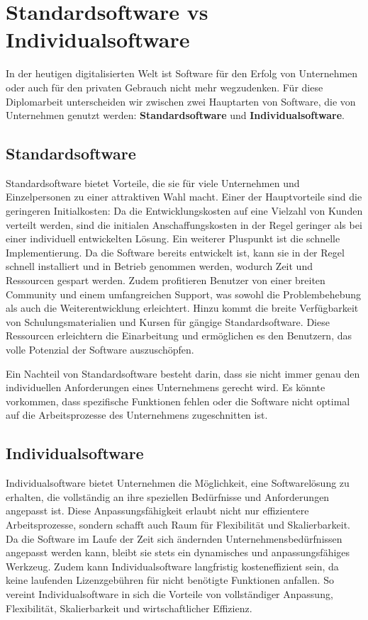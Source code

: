 \section {Standardsoftware vs Individualsoftware}

In der heutigen digitalisierten Welt ist Software 
für den Erfolg von Unternehmen oder auch für den privaten Gebrauch nicht mehr wegzudenken.
Für diese Diplomarbeit unterscheiden wir zwischen zwei Hauptarten von Software, 
die von Unternehmen genutzt werden: 
\textbf{Standardsoftware} und 
\textbf{Individualsoftware}.

\subsection*{Standardsoftware}

Standardsoftware bietet Vorteile, die sie für viele Unternehmen und Einzelpersonen 
zu einer attraktiven Wahl macht. Einer der Hauptvorteile sind die geringeren Initialkosten: 
Da die Entwicklungskosten auf eine Vielzahl von Kunden verteilt werden, sind die initialen 
Anschaffungskosten in der Regel geringer als bei einer individuell entwickelten Lösung. 
Ein weiterer Pluspunkt ist die schnelle Implementierung. Da die Software bereits entwickelt ist, 
kann sie in der Regel schnell installiert und in Betrieb genommen werden, 
wodurch Zeit und Ressourcen gespart werden. Zudem profitieren Benutzer von einer 
breiten Community und einem umfangreichen Support, was sowohl die Problembehebung 
als auch die Weiterentwicklung erleichtert. Hinzu kommt die breite Verfügbarkeit von 
Schulungsmaterialien und Kursen für gängige Standardsoftware. 
Diese Ressourcen erleichtern die Einarbeitung und ermöglichen es den Benutzern, 
das volle Potenzial der Software auszuschöpfen.

Ein Nachteil von Standardsoftware besteht darin, dass sie nicht immer genau 
den individuellen Anforderungen eines Unternehmens gerecht wird. 
Es könnte vorkommen, dass spezifische Funktionen fehlen oder die Software 
nicht optimal auf die Arbeitsprozesse des Unternehmens zugeschnitten ist.

\newpage
\subsection*{Individualsoftware}

Individualsoftware bietet Unternehmen die Möglichkeit, eine Softwarelösung 
zu erhalten, die vollständig an ihre speziellen Bedürfnisse und Anforderungen angepasst ist. 
Diese Anpassungsfähigkeit erlaubt nicht nur effizientere Arbeitsprozesse, 
sondern schafft auch Raum für Flexibilität und Skalierbarkeit. 
Da die Software im Laufe der Zeit sich ändernden Unternehmensbedürfnissen angepasst werden kann, 
bleibt sie stets ein dynamisches und anpassungsfähiges Werkzeug. 
Zudem kann Individualsoftware langfristig kosteneffizient sein, da keine laufenden 
Lizenzgebühren für nicht benötigte Funktionen anfallen. 
So vereint Individualsoftware in sich die Vorteile von vollständiger Anpassung, 
Flexibilität, Skalierbarkeit und wirtschaftlicher Effizienz.

